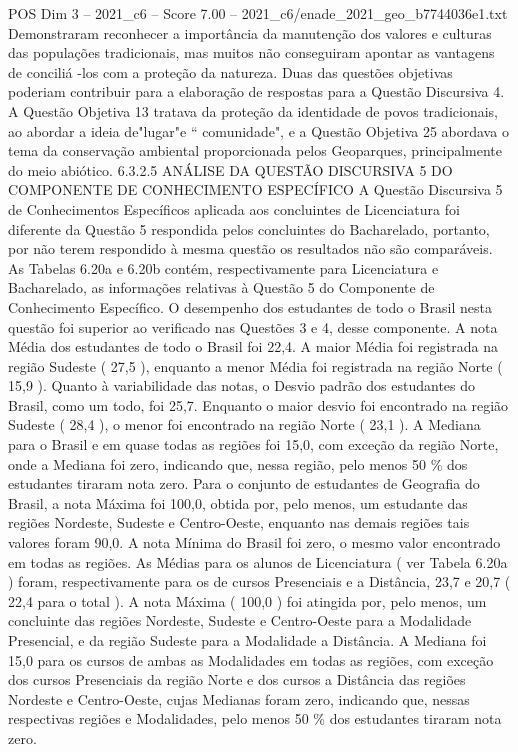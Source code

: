 \begin{textsample}{POS Dim 3 – 2021\_c6 – Score 7.00 – 2021\_c6/enade\_2021\_geo\_b7744036e1.txt}
Demonstraram reconhecer a importância da manutenção dos valores e culturas das populações tradicionais, mas muitos não conseguiram apontar as vantagens de conciliá -los com a proteção da natureza.
Duas das questões objetivas poderiam contribuir para a elaboração de respostas para a Questão Discursiva 4.
A Questão Objetiva 13 tratava da proteção da identidade de povos tradicionais, ao abordar a ideia de"lugar"e “ comunidade", e a Questão Objetiva 25 abordava o tema da conservação ambiental proporcionada pelos Geoparques, principalmente do meio abiótico. 6.3.2.5 ANÁLISE DA QUESTÃO DISCURSIVA 5 DO COMPONENTE DE CONHECIMENTO ESPECÍFICO A Questão Discursiva 5 de Conhecimentos Específicos aplicada aos concluintes de Licenciatura foi diferente da Questão 5 respondida pelos concluintes do Bacharelado, portanto, por não terem respondido à mesma questão os resultados não são comparáveis.
As Tabelas 6.20a e 6.20b contém, respectivamente para Licenciatura e Bacharelado, as informações relativas à Questão 5 do Componente de Conhecimento Específico.
O desempenho dos estudantes de todo o Brasil nesta questão foi superior ao verificado nas Questões 3 e 4, desse componente.
A nota Média dos estudantes de todo o Brasil foi 22,4.
A maior Média foi registrada na região Sudeste ( 27,5 ), enquanto a menor Média foi registrada na região Norte ( 15,9 ).
Quanto à variabilidade das notas, o Desvio padrão dos estudantes do Brasil, como um todo, foi 25,7.
Enquanto o maior desvio foi encontrado na região Sudeste ( 28,4 ), o menor foi encontrado na região Norte ( 23,1 ).
A Mediana para o Brasil e em quase todas as regiões foi 15,0, com exceção da região Norte, onde a Mediana foi zero, indicando que, nessa região, pelo menos 50 \% dos estudantes tiraram nota zero.
Para o conjunto de estudantes de Geografia do Brasil, a nota Máxima foi 100,0, obtida por, pelo menos, um estudante das regiões Nordeste, Sudeste e Centro-Oeste, enquanto nas demais regiões tais valores foram 90,0.
A nota Mínima do Brasil foi zero, o mesmo valor encontrado em todas as regiões.
As Médias para os alunos de Licenciatura ( ver Tabela 6.20a ) foram, respectivamente para os de cursos Presenciais e a Distância, 23,7 e 20,7 ( 22,4 para o total ).
A nota Máxima ( 100,0 ) foi atingida por, pelo menos, um concluinte das regiões Nordeste, Sudeste e Centro-Oeste para a Modalidade Presencial, e da região Sudeste para a Modalidade a Distância.
A Mediana foi 15,0 para os cursos de ambas as Modalidades em todas as regiões, com exceção dos cursos Presenciais da região Norte e dos cursos a Distância das regiões Nordeste e Centro-Oeste, cujas Medianas foram zero, indicando que, nessas respectivas regiões e Modalidades, pelo menos 50 \% dos estudantes tiraram nota zero.

\end{textsample}
